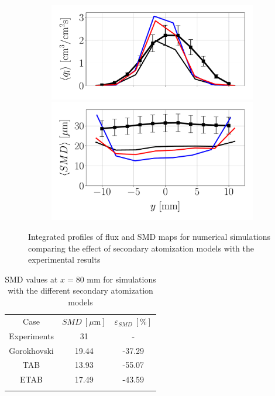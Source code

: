 \begin{figure}[h!]
\begin{subfigure}[b]{0.2\textwidth}
\end{subfigure}
\hspace*{0.1in}
\begin{subfigure}[b]{0.4\textwidth}
	\flushleft
   \includegraphics[scale=0.35]{./part2_developments/figures_ch6_lagrangian_JICF/params_breakup_model/profiles/flux_along_y}\\
   \vspace{-0.16in}
   \includegraphics[scale=0.35]{./part2_developments/figures_ch6_lagrangian_JICF/params_breakup_model/profiles/SMD_along_y}
\end{subfigure}

\caption{Integrated profiles of flux and SMD maps for numerical simulations comparing the effect of secondary atomization models with the experimental results}
\label{fig:profiles_LGS_JICF_secondary_atom_model}
\end{figure}




\clearpage

\begin{table}[!h]
\centering
\caption{SMD values at $x = 80$ mm for simulations with the different secondary atomization models}
\begin{tabular}{ccc}
\thickhline
Case & $SMD~\left[\mu \mathrm{m} \right]$ & $\varepsilon_{SMD}~\left[\% \right]$ \\
\thickhline
Experiments & 31 & - \\
Gorokhovski & 19.44 & -37.29 \\
TAB & 13.93 & -55.07 \\
ETAB & 17.49 & -43.59 \\
\thickhline
\end{tabular}
\label{tab:SMD_deviations_breakup_model}
\end{table}

